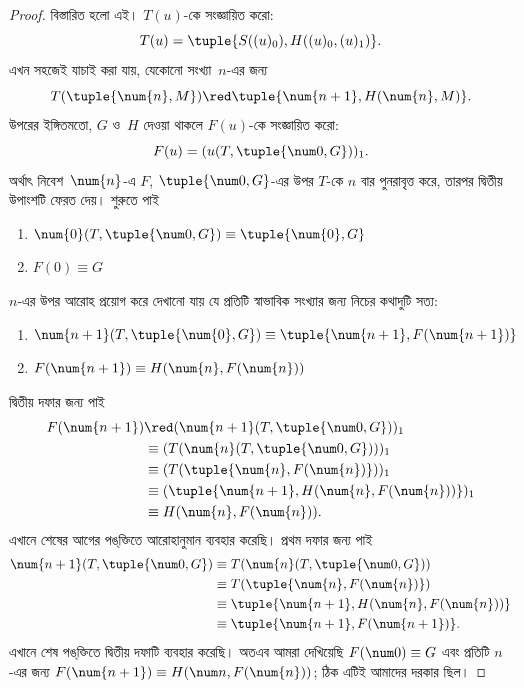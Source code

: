 \documentclass[../../../include/open-logic-section]{subfiles}
\begin{document}
\begin{proof}
বিস্তারিত হলো এই। $T(u)$-কে সংজ্ঞায়িত করো:
\[
T(u) = \tuple{S((u)_0), H((u)_0,(u)_1)}.
\]
এখন সহজেই যাচাই করা যায়, যেকোনো সংখ্যা~$n$-এর জন্য
\[
T(\tuple{\num{n}, M}) \red \tuple{\num{n+1}, H(\num{n}, M)}.
\]
উপরের ইঙ্গিতমতো, $G$ ও~$H$ দেওয়া থাকলে $F(u)$-কে সংজ্ঞায়িত করো:
\[
F(u) = (u(T,\tuple{\num 0, G}))_1.
\]
অর্থাৎ নিবেশ~$\num{n}$-এ $F$, $\tuple{\num 0, G}$-এর উপর $T$-কে
$n$ বার পুনরাবৃত্ত করে, তারপর দ্বিতীয় উপাংশটি ফেরত দেয়। শুরুতে পাই
\begin{enumerate}
\item $\num{0} (T, \tuple{\num 0, G}) \equiv \tuple{\num{0}, G}$
\item $F(\num{0}) \equiv G$
\end{enumerate}
$n$-এর উপর আরোহ প্রয়োগ করে দেখানো যায় যে প্রতিটি স্বাভাবিক সংখ্যার
জন্য নিচের কথাদুটি সত্য:
\begin{enumerate}
\item $\num{n+1}(T, \tuple{\num{0}, G}) \equiv \tuple{\num{n+1}, F(\num{n+1})}$
\item $F(\num{n+1}) \equiv H(\num{n}, F(\num{n}))$
\end{enumerate}
দ্বিতীয় দফার জন্য পাই
\begin{align*}
F(\num{n+1}) & \red (\num{n+1}(T, \tuple{\num 0, G}))_1 \\
& \equiv (T(\num{n} (T, \tuple{\num 0, G})))_1 \\
& \equiv (T(\tuple{\num{n}, F(\num{n})}))_1 \\
& \equiv (\tuple{\num{n+1}, H(\num{n}, F(\num{n}))})_1 \\
& \equiv H(\num{n}, F(\num{n})).
\end{align*}
এখানে শেষের আগের পঙ্‌ক্তিতে আরোহানুমান ব্যবহার করেছি। প্রথম দফার জন্য
পাই
\begin{align*}
\num{n+1} (T, \tuple{\num 0, G}) &
\equiv T(\num{n} (T, \tuple{\num 0, G})) \\
& \equiv T( \tuple{\num{n}, F(\num{n})}) \\
& \equiv \tuple{\num{n+1}, H(\num{n}, F(\num{n}))} \\
& \equiv \tuple{\num{n+1}, F(\num{n+1})}.
\end{align*}
এখানে শেষ পঙ্‌ক্তিতে দ্বিতীয় দফাটি ব্যবহার করেছি। অতএব আমরা দেখিয়েছি
$F(\num 0) \equiv G$ এবং প্রতিটি $n$-এর জন্য $F(\num {n+1}) \equiv H(\num
n, F(\num{n}))$; ঠিক এটিই আমাদের দরকার ছিল।
\end{proof}
\end{document}

